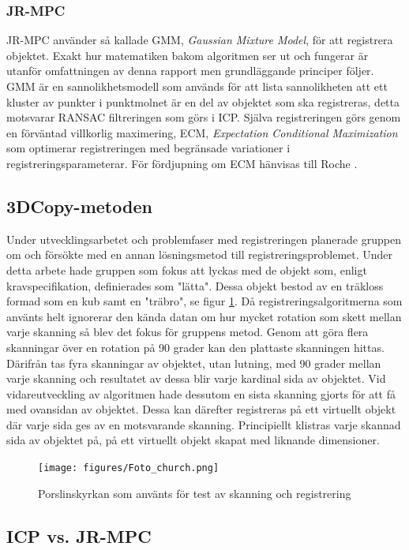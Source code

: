 \subsubsection{JR-MPC}
JR-MPC använder så kallade GMM, \textit{Gaussian Mixture Model}, för att registrera objektet. Exakt hur matematiken bakom algoritmen ser ut och fungerar är utanför omfattningen av denna rapport men grundläggande principer följer. GMM är en sannolikhetsmodell som används för att lista sannolikheten att ett kluster av punkter i punktmolnet är en del av objektet som ska registreras, detta motsvarar RANSAC filtreringen som görs i ICP. Själva registreringen görs genom en förväntad villkorlig maximering, ECM, \textit{Expectation Conditional Maximization} som optimerar registreringen med begränsade variationer i registreringsparameterar. För fördjupning om ECM hänvisas till Roche \cite{roche2011algorithm}.

\subsection{3DCopy-metoden}
Under utvecklingsarbetet och problemfaser med registreringen planerade gruppen om och försökte med en annan lösningsmetod till registreringsproblemet. Under detta arbete hade gruppen som fokus att lyckas med de objekt som, enligt kravspecifikation, definierades som "lätta". Dessa objekt bestod av en träkloss formad som en kub samt en "träbro", se figur \ref{fig:foto_church}. Då registreringsalgoritmerna som använts helt ignorerar den kända datan om hur mycket rotation som skett mellan varje skanning så blev det fokus för gruppens metod. Genom att göra flera skanningar över en rotation på 90 grader kan den plattaste skanningen hittas. Därifrån tas fyra skanningar av objektet, utan lutning, med 90 grader mellan varje skanning och resultatet av dessa blir varje kardinal sida av objektet. Vid vidareutveckling av algoritmen hade dessutom en sista skanning gjorts för att få med ovansidan av objektet. Dessa kan därefter registreras på ett virtuellt objekt där varje sida ges av en motsvarande skanning. Principiellt klistras varje skannad sida av objektet på, på ett virtuellt objekt skapat med liknande dimensioner. 

\begin{figure}[H]
	\centering
	\texttt{[image: figures/Foto\_church.png]}
	\caption{Porslinskyrkan som använts för test av skanning och registrering}
	\label{fig:foto_church}
\end{figure}

\subsection{ICP vs. JR-MPC}

